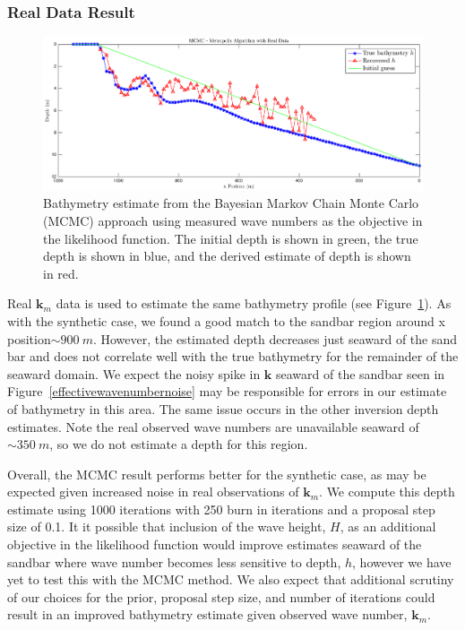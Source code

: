 \subsubsection{Real Data Result}
\begin{figure}[H]
\center
\includegraphics[scale=0.46]{img/MCMC-realdata-600.eps}
\caption{Bathymetry estimate from the Bayesian Markov Chain Monte Carlo (MCMC) approach using measured wave numbers as the objective in the likelihood function. The initial depth is shown in green, the true depth is shown in blue, and the derived estimate of depth is shown in red.}
\label{mcmc-real}
\end{figure}

Real $\mathbf{k}_m$ data is used to estimate the same bathymetry profile (see Figure~\ref{mcmc-real}). As with the synthetic case, we found a good match to the sandbar region around x position$\sim900~m$. However, the estimated depth decreases just seaward of the sand bar and does not correlate well with the true bathymetry for the remainder of the seaward domain. We expect the noisy spike in $\mathbf{k}$ seaward of the sandbar seen in  Figure~\ref{effectivewavenumbernoise} may be responsible for errors in our estimate of bathymetry in this area. The same issue occurs in the other inversion depth estimates. Note the real observed wave numbers are unavailable seaward of $\sim350~m$, so we do not estimate a depth for this region. 

Overall, the MCMC result performs better for the synthetic case, as may be expected given increased noise in real observations of $\mathbf{k}_m$. We compute this depth estimate using 1000 iterations with 250 burn in iterations and a proposal step size of 0.1. It it possible that inclusion of the wave height, $H$, as an additional objective in the likelihood function would improve estimates seaward of the sandbar where  wave number becomes less sensitive to depth, $h$, however we have yet to test this with the MCMC method. We also expect that additional scrutiny of our choices for the prior, proposal step size, and number of iterations could result in an improved bathymetry estimate given observed wave number, $\mathbf{k}_m$. 

